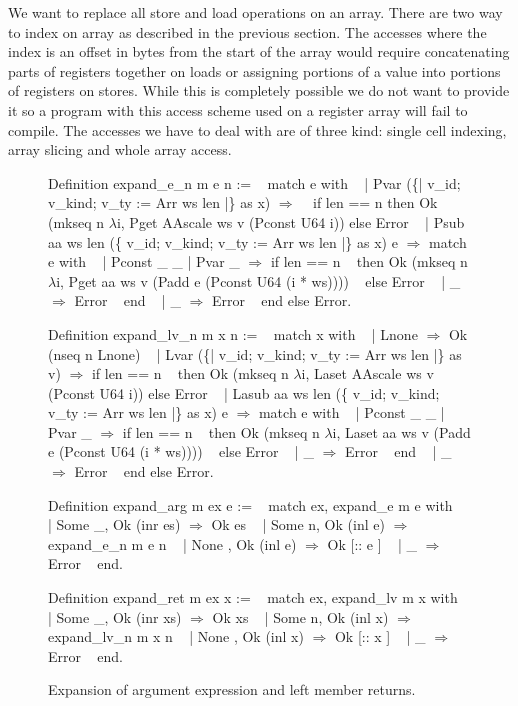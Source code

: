 \documentclass{article}
\begin{document}
\medskip

We want to replace all store and load operations on an array. There are two way
to index on array as described in the previous section. The accesses where the
index is an offset in bytes from the start of the array would require
concatenating parts of registers together on loads or assigning portions of a
value into portions of registers on stores. While this is completely possible we
do not want to provide it so a program with this access scheme used on a
register array will fail to compile.
The accesses we have to deal with are of three kind: single cell indexing,
array slicing and whole array access.

\smallskip

\begin{figure}[p]
\obeylines\obeyspaces\ttfamily%
Definition expand\_e\_n m e n :=
~ match e with
~ | Pvar (\{| v\_id; v\_kind; v\_ty := Arr ws len |\} as x) \(\Rightarrow\)
~   if len == n then Ok (mkseq n \(\lambda\)i, Pget AAscale ws v (Pconst U64 i)) else Error
~ | Psub aa ws len (\{ v\_id; v\_kind; v\_ty := Arr ws len |\} as x) e \(\Rightarrow\) match e with
~   | Pconst \_ \_ | Pvar \_ \(\Rightarrow\) if len == n
~     then Ok (mkseq n \(\lambda\)i, Pget aa ws v (Padd e (Pconst U64 (i * ws))))
~     else Error
~   | \_ \(\Rightarrow\) Error
~   end
~ | \_ \(\Rightarrow\) Error
~ end else Error.
 
Definition expand\_lv\_n m x n :=
~ match x with
~ | Lnone \(\Rightarrow\) Ok (nseq n Lnone)
~ | Lvar (\{| v\_id; v\_kind; v\_ty := Arr ws len |\} as v) \(\Rightarrow\) if len == n
~   then Ok (mkseq n \(\lambda\)i, Laset AAscale ws v (Pconst U64 i)) else Error
~ | Lasub aa ws len (\{ v\_id; v\_kind; v\_ty := Arr ws len |\} as x) e \(\Rightarrow\) match e with
~   | Pconst \_ \_ | Pvar \_ \(\Rightarrow\) if len == n
~     then Ok (mkseq n \(\lambda\)i, Laset aa ws v (Padd e (Pconst U64 (i * ws))))
~     else Error
~   | \_ \(\Rightarrow\) Error
~   end
~ | \_ \(\Rightarrow\) Error
~ end else Error.

Definition expand\_arg m ex e :=
~ match ex, expand\_e m e with
~ | Some \_, Ok (inr es)  \(\Rightarrow\) Ok es
~ | Some n, Ok (inl e)   \(\Rightarrow\) expand\_e\_n m e n
~ | None  , Ok (inl e)   \(\Rightarrow\) Ok [:: e ]
~ | \_                    \(\Rightarrow\) Error
~ end.

Definition expand\_ret m ex x :=
~ match ex, expand\_lv m x with
~ | Some \_, Ok (inr xs)   \(\Rightarrow\) Ok xs
~ | Some n, Ok (inl x)    \(\Rightarrow\) expand\_lv\_n m x n
~ | None  , Ok (inl x)    \(\Rightarrow\) Ok [:: x ]
~ | \_                     \(\Rightarrow\) Error
~ end.
\normalfont%
\caption{Expansion of argument expression and left member returns.}
\end{figure}
\end{document}
